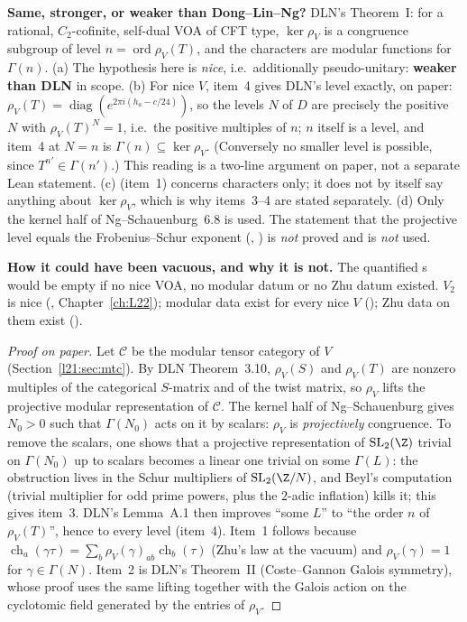 \begin{dictionary}
\textbf{Same, stronger, or weaker than Dong--Lin--Ng?} DLN's Theorem~I: for a rational, $C_2$-cofinite, self-dual VOA of CFT type,
$\ker\rho_V$ is a congruence subgroup of level $n=\operatorname{ord}\rho_V(T)$, and the characters are modular functions for
$\Gamma(n)$. (a) The hypothesis here is \emph{nice}, i.e.\ additionally pseudo-unitary: \textbf{weaker than DLN} in scope.
(b) For nice $V$, item~4 gives DLN's level exactly, on paper: $\rho_V(T)=\operatorname{diag}(e^{2\pi i(h_a-c/24)})$, so the levels
$N$ of $D$ are precisely the positive $N$ with $\rho_V(T)^N=1$, i.e.\ the positive multiples of $n$; $n$ itself is a level, and
item~4 at $N=n$ is $\Gamma(n)\subseteq\ker\rho_V$. (Conversely no smaller level is possible, since $T^{n'}\in\Gamma(n')$.) This
reading is a two-line argument on paper, not a separate Lean statement. (c)  (item~1) concerns
characters only; it does not by itself say anything about $\ker\rho_V$, which is why items~3--4 are stated separately.
(d) Only the kernel half of Ng--Schauenburg~6.8 is used. The statement that the projective level equals the Frobenius--Schur
exponent (, ) is \emph{not} proved and is \emph{not} used.

\textbf{How it could have been vacuous, and why it is not.} The quantified s would be empty if no nice VOA, no modular
datum or no Zhu datum existed. $V_2$ is nice (, Chapter~\ref{ch:L22}); modular data exist for every nice $V$
(); Zhu data on them exist ().
\end{dictionary}

\begin{proof}[Proof on paper]
Let $\mathcal C$ be the modular tensor category of $V$ (Section~\ref{l21:sec:mtc}). By DLN Theorem~3.10, $\rho_V(S)$ and
$\rho_V(T)$ are nonzero multiples of the categorical $S$-matrix and of the twist matrix, so $\rho_V$ lifts the projective modular
representation of $\mathcal C$. The kernel half of Ng--Schauenburg gives $N_0>0$ such that $\Gamma(N_0)$ acts on it by scalars:
$\rho_V$ is \emph{projectively} congruence. To remove the scalars, one shows that a projective representation of
$\ltwooneSL(\Z)$ trivial on $\Gamma(N_0)$ up to scalars becomes a linear one trivial on some $\Gamma(L)$: the obstruction lives in
the Schur multipliers of $\ltwooneSL(\Z/N)$, and Beyl's computation (trivial multiplier for odd prime powers, plus the $2$-adic
inflation) kills it; this gives item~3. DLN's Lemma~A.1 then improves ``some $L$'' to ``the order $n$ of $\rho_V(T)$'', hence to
every level (item~4). Item~1 follows because $\operatorname{ch}_a(\gamma\tau)=\sum_b\rho_V(\gamma)_{ab}\operatorname{ch}_b(\tau)$
(Zhu's law at the vacuum) and $\rho_V(\gamma)=1$ for $\gamma\in\Gamma(N)$. Item~2 is DLN's Theorem~II (Coste--Gannon Galois
symmetry), whose proof uses the same lifting together with the Galois action on the cyclotomic field generated by the entries of
$\rho_V$.
\end{proof}

